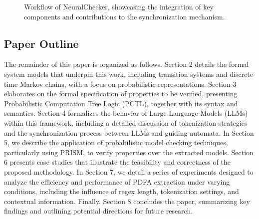 \documentclass{article}
\begin{document}
\begin{figure}[htbp]
\caption{Workflow of NeuralChecker, showcasing the integration of key components and contributions to the synchronization mechanism.} %
    \label{fig:neuralchecker} %
\end{figure}

\subsection{Paper Outline}

The remainder of this paper is organized as follows. Section 2 details the formal system models that underpin this work, including transition systems and discrete-time Markov chains, with a focus on probabilistic representations. Section 3 elaborates on the formal specification of properties to be verified, presenting Probabilistic Computation Tree Logic (PCTL), together with its syntax and semantics. Section 4 formalizes the behavior of Large Language Models (LLMs) within this framework, including a detailed discussion of tokenization strategies and the synchronization process between LLMs and guiding automata. In Section 5, we describe the application of probabilistic model checking techniques, particularly using PRISM, to verify properties over the extracted models. Section 6 presents case studies that illustrate the feasibility and correctness of the proposed methodology. In Section 7, we detail a series of experiments designed to analyze the efficiency and performance of PDFA extraction under varying conditions, including the influence of regex length, tokenization settings, and contextual information. Finally, Section 8 concludes the paper, summarizing key findings and outlining potential directions for future research.
\end{document}
